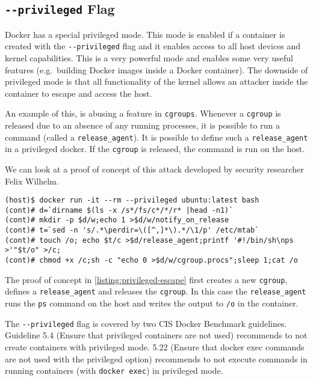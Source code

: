 \subsection{\texorpdfstring{\lstinline{--privileged}}{--privileged} Flag}\label{subsection:privileged}

Docker has a special privileged mode\cite{Docker-in-Docker-blog}. This mode is enabled if a container is created with the \lstinline{--privileged} flag and it enables access to all host devices and kernel capabilities. This is a very powerful mode and enables some very useful features (e.g.\ building Docker images inside a Docker container). The downside of privileged mode is that all functionality of the kernel allows an attacker inside the container to escape and access the host.

\medskip

An example of this, is abusing a feature in \lstinline{cgroups}\cite{CGroup-Docs}. Whenever a \lstinline{cgroup} is released due to an absence of any running processes, it is possible to run a command (called a \lstinline{release_agent}). It is possible to define such a \lstinline{release_agent} in a privileged docker. If the \lstinline{cgroup} is released, the command is run on the host\cite{TrailOfBits-Docker-Escape}.

\medskip

We can look at a proof of concept of this attack developed by security researcher Felix Wilhelm\cite{Felix-Wilhem-Tweet}.
\begin{lstlisting}[caption={Privileged container escape using \lstinline{cgroups}.},captionpos=b,label={listing:privileged-escape}]
(host)$ docker run -it --rm --privileged ubuntu:latest bash
(cont)# d=`dirname $(ls -x /s*/fs/c*/*/r* |head -n1)`
(cont)# mkdir -p $d/w;echo 1 >$d/w/notify_on_release
(cont)# t=`sed -n 's/.*\perdir=\([^,]*\).*/\1/p' /etc/mtab`
(cont)# touch /o; echo $t/c >$d/release_agent;printf '#!/bin/sh\nps >'"$t/o" >/c;
(cont)# chmod +x /c;sh -c "echo 0 >$d/w/cgroup.procs";sleep 1;cat /o
\end{lstlisting}

The proof of concept in \autoref{listing:privileged-escape} first creates a new \lstinline{cgroup}, defines a \lstinline{release_agent} and releases the \lstinline{cgroup}. In this case the \lstinline{release_agent} runs the \lstinline{ps} command on the host and writes the output to \lstinline{/o} in the container.

\medskip

The \lstinline{--privileged} flag is covered by two CIS Docker Benchmark guidelines. Guideline 5.4 (Ensure that privileged containers are not used) recommends to not create containers with privileged mode. 5.22 (Ensure that docker exec commands are not used with the privileged option) recommends to not execute commands in running containers (with \lstinline{docker exec}) in privileged mode.

